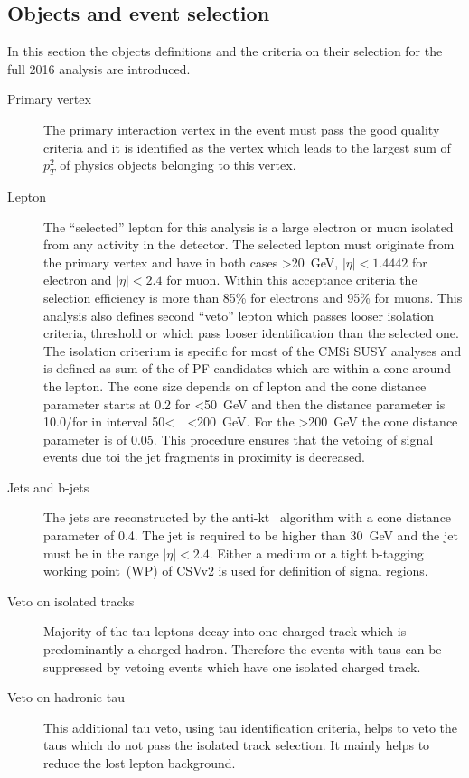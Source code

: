 
\subsection{Objects and event selection~\label{sec:objects}}


In this section the objects definitions and the criteria on their selection for the full 2016 analysis are introduced.

\begin{description}
\item[Primary vertex]
The primary interaction vertex in the event must pass the good quality criteria and it is identified as the vertex which leads to the largest sum of $p_{T}^{2}$ of physics objects belonging to this vertex.

\item[Lepton]
The ``selected'' lepton for this analysis is a large \pt electron or muon isolated from any activity in the detector. The selected lepton must originate from the primary vertex and have in both cases \pt>20~GeV, $|\eta|<1.4442$ for electron and $|\eta|<2.4$ for muon. Within this acceptance criteria the selection efficiency is more than 85\% for electrons and 95\% for muons. This analysis also defines second ``veto'' lepton which passes looser isolation criteria, \pt threshold or which pass looser identification than the selected one. The isolation criterium is specific for most of the CMSi SUSY analyses and is defined as sum of the \pt of PF candidates which are within a cone around the lepton. The cone size depends on \pt of lepton and the cone distance parameter  starts at 0.2 for \pt<50~GeV and then the distance parameter is 10.0/\pt for \pt in interval 50<~\pt~<200~GeV. For the \pt>200~GeV the cone distance parameter is of 0.05. This procedure ensures that the vetoing of signal events due toi the jet fragments in proximity is decreased.   

\item[Jets and b-jets]
The jets are reconstructed by the anti-kt~\cite{Cacciari:2008gp} algorithm with a cone distance parameter of 0.4. The jet \pt is required to be higher than 30~GeV and the jet must be in the range $|\eta|<2.4$. Either a medium or a tight b-tagging working point~(WP) of CSVv2 is used for definition of signal regions.  

\item[Veto on isolated tracks]
Majority of the tau leptons decay into one charged track which is predominantly a charged hadron. Therefore the events with taus can be suppressed by vetoing events which have one isolated charged track.

\item[Veto on hadronic tau]
This additional tau veto, using tau identification criteria, helps to veto the taus which do not pass the isolated track selection. It mainly helps to reduce the lost lepton background.
\end{description}

